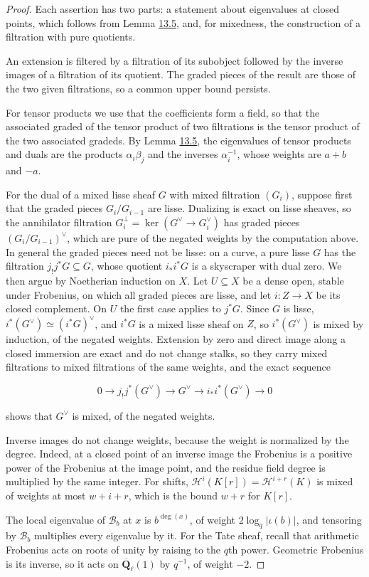 \documentclass[11pt]{article}
\begin{document}
\begin{proof}[{Proof}]\label{bp23}%
Each assertion has two parts: a statement about eigenvalues at closed points, which follows from Lemma \hyperref[bp17]{13.5}, and, for mixedness, the construction of a filtration with pure quotients.

An extension is filtered by a filtration of its subobject followed by the inverse images of a filtration of its quotient. The graded pieces of the result are those of the two given filtrations, so a common upper bound persists.

For tensor products we use that the coefficients form a field, so that the associated graded of the tensor product of two filtrations is the tensor product of the two associated gradeds. By Lemma \hyperref[bp17]{13.5}, the eigenvalues of tensor products and duals are the products \(\alpha_i\beta_j\) and the inverses \(\alpha_i^{-1}\), whose weights are \(a+b\) and \(-a\).

For the dual of a mixed lisse sheaf \(G\) with mixed filtration \((G_i)\), suppose first that the graded pieces \(G_i/G_{i-1}\) are lisse. Dualizing is exact on lisse sheaves, so the annihilator filtration \(G_i^\perp=\ker(G^\vee\to G_i^\vee)\) has graded pieces \((G_i/G_{i-1})^\vee\), which are pure of the negated weights by the computation above. In general the graded pieces need not be lisse: on a curve, a pure lisse \(G\) has the filtration \(j_!j^*G\subseteq G\), whose quotient \(i_*i^*G\) is a skyscraper with dual zero. We then argue by Noetherian induction on \(X\). Let \(U\subseteq X\) be a dense open, stable under Frobenius, on which all graded pieces are lisse, and let \(i:Z\to X\) be its closed complement. On \(U\) the first case applies to \(j^*G\). Since \(G\) is lisse, \(i^*(G^\vee)\simeq(i^*G)^\vee\), and \(i^*G\) is a mixed lisse sheaf on \(Z\), so \(i^*(G^\vee)\) is mixed by induction, of the negated weights. Extension by zero and direct image along a closed immersion are exact and do not change stalks, so they carry mixed filtrations to mixed filtrations of the same weights, and the exact sequence

\[
0\to j_!j^*(G^\vee)\to G^\vee\to i_*i^*(G^\vee)\to 0
\]

shows that \(G^\vee\) is mixed, of the negated weights.

Inverse images do not change weights, because the weight is normalized by the degree. Indeed, at a closed point of an inverse image the Frobenius is a positive power of the Frobenius at the image point, and the residue field degree is multiplied by the same integer. For shifts, \(\mathcal H^i(K[r])=\mathcal H^{i+r}(K)\) is mixed of weights at most \(w+i+r\), which is the bound \(w+r\) for \(K[r]\).

The local eigenvalue of \(\mathcal B_b\) at \(x\) is \(b^{\deg(x)}\), of weight \(2\log_q|\iota(b)|\), and tensoring by \(\mathcal B_b\) multiplies every eigenvalue by it. For the Tate sheaf, recall that arithmetic Frobenius acts on roots of unity by raising to the \(q\)th power. Geometric Frobenius is its inverse, so it acts on \(\overline{\mathbf Q}_\ell(1)\) by \(q^{-1}\), of weight \(-2\).
\end{proof}
\end{document}
